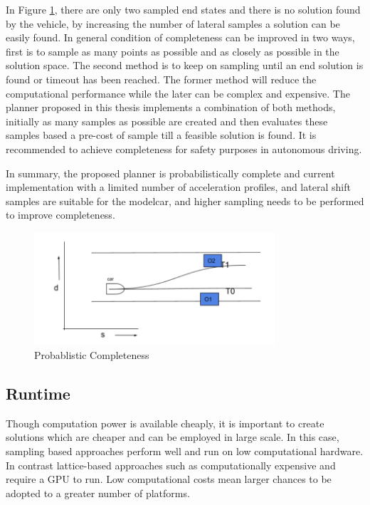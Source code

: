 In Figure \ref{probablistically_complete}, there are only two sampled end states and there is no solution found by the vehicle, by increasing the number of lateral samples a solution can be easily found. In general condition of completeness can be improved in two ways, first is to sample as many points as possible and as closely as possible in the solution space. The second method is to keep on sampling until an end solution is found or timeout has been reached. The former method will reduce the computational performance while the later can be complex and expensive. The planner proposed in this thesis implements a combination of both methods, initially as many samples as possible are created and then evaluates these samples based a pre-cost of sample till a feasible solution is found. It is recommended to achieve completeness for safety purposes in autonomous driving.


In summary, the proposed planner is probabilistically complete and current implementation with a limited number of acceleration profiles, and lateral shift samples are suitable for the modelcar, and higher sampling needs to be performed to improve completeness.  

 \begin{figure}
    \centering
    \includegraphics[width=0.8\textwidth]{Images/probablistically_complete.png}
    \caption{Probablistic Completeness}
    \label{probablistically_complete}
\end{figure}

\subsection{Runtime}

Though computation power is available cheaply, it is important to create solutions which are cheaper and can be employed in large scale. In this case, sampling based approaches perform well and run on low computational hardware. In contrast lattice-based approaches such as \cite{cmu_parallel_thesis} \cite{diss_shui_phd_thesis} \cite{werling_frenet} computationally expensive and require a GPU to run. Low computational costs mean larger chances to be adopted to a greater number of platforms.

